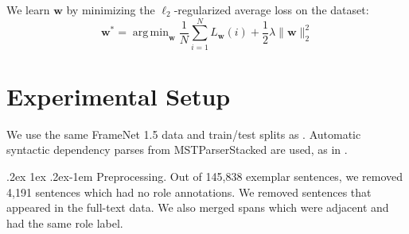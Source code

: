 \documentclass[11pt,a4paper]{article}
\makeatletter
\newcommand{\indicator}[1]{I_{\{#1\}}} %
\DeclareMathOperator*{\argmin}{arg\,min}
\newcommand{\ensuretext}[1]{#1}
\newcommand{\nssmarker}{\ensuretext{\textcolor{magenta}{\ensuremath{^{\textsc{NS}}_{\textsc{S}}}}}}
\newcommand{\stmarker}{\ensuretext{\textcolor{orange}{\ensuremath{^{\textsc{S}}_{\textsc{T}}}}}}
\newcommand{\nasmarker}{\ensuretext{\textcolor{blue}{\ensuremath{^{\textsc{NA}}_{\textsc{S}}}}}}
\newcommand{\arkcomment}[3]{\ensuretext{\textcolor{#3}{[#1 #2]}}}
\newcommand{\nss}[1]{\arkcomment{\nssmarker}{#1}{magenta}}
\newcommand{\st}[1]{\arkcomment{\stmarker}{#1}{orange}}
\newcommand{\nascomment}[1]{\arkcomment{\nasmarker}{#1}{blue}}
\renewcommand{\paragraph}{%
  \@startsection{paragraph}{4}%
  {\z@}{.2ex \@plus 1ex \@minus .2ex}{-1em}%
  {\normalfont\normalsize\bfseries}%
}
\makeatother
\begin{document}
We learn $\mathbf{w}$ by minimizing the $\ell_2$-regularized average loss on the dataset:
\begin{equation}
\mathbf{w^*} = \argmin_\mathbf{w}{
    \frac{1}{N}\sum_{i = 1}^N L_{\mathbf{w}}(i) + \frac{1}{2} \lambda \| \mathbf{w} \|_2^2
}
\end{equation}

\section{Experimental Setup}

We use the same FrameNet 1.5 data and train/test splits as \citet{das-14}.
Automatic syntactic dependency parses from MSTParserStacked \citep{martins-08} are used, as in \citet{das-14}.



\paragraph{Preprocessing.}
Out of 145,838 exemplar sentences, we removed
4,191 sentences which had no role annotations.
We removed sentences that appeared in the full-text
data. We also merged spans which were adjacent and had the
same role label.
\end{document}
